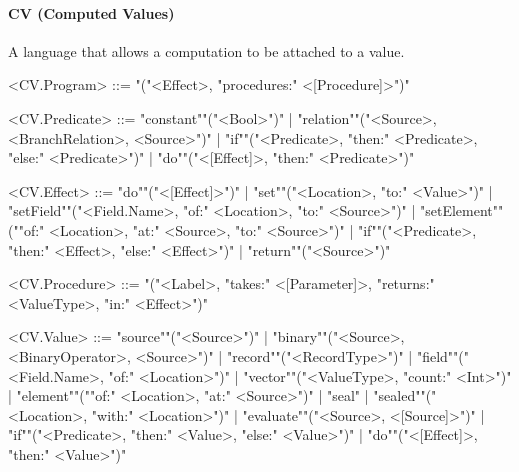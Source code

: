 \documentclass[main.tex]{subfiles}
\begin{document}
\paragraph{ CV (Computed Values) } A language that allows a computation to be attached to a value.
\begin{grammar}
	\footnotesize
				<CV.Program> ::=
							"("<Effect>, "procedures:" <[Procedure]>")"
				\par
				<CV.Predicate> ::=
						"constant""("<Bool>")"
						| "relation""("<Source>, <BranchRelation>, <Source>")"
						| "if""("<Predicate>, "then:" <Predicate>, "else:" <Predicate>")"
						| "do""("<[Effect]>, "then:" <Predicate>")"
				\par
				<CV.Effect> ::=
						"do""("<[Effect]>")"
						| "set""("<Location>, "to:" <Value>")"
						| "setField""("<Field.Name>, "of:" <Location>, "to:" <Source>")"
						| "setElement""(""of:" <Location>, "at:" <Source>, "to:" <Source>")"
						| "if""("<Predicate>, "then:" <Effect>, "else:" <Effect>")"
						| "return""("<Source>")"
				\par
				<CV.Procedure> ::=
							"("<Label>, "takes:" <[Parameter]>, "returns:" <ValueType>, "in:" <Effect>")"
				\par
				<CV.Value> ::=
						"source""("<Source>")"
						| "binary""("<Source>, <BinaryOperator>, <Source>")"
						| "record""("<RecordType>")"
						| "field""("<Field.Name>, "of:" <Location>")"
						| "vector""("<ValueType>, "count:" <Int>")"
						| "element""(""of:" <Location>, "at:" <Source>")"
						| "seal"
						| "sealed""("<Location>, "with:" <Location>")"
						| "evaluate""("<Source>, <[Source]>")"
						| "if""("<Predicate>, "then:" <Value>, "else:" <Value>")"
						| "do""("<[Effect]>, "then:" <Value>")"
				\par
\end{grammar}
\par
\end{document}
